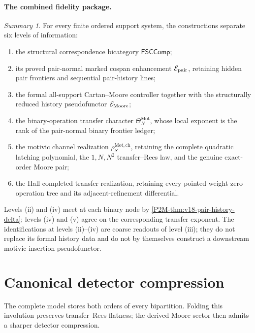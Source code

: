 \documentclass[11pt]{article}
\theoremstyle{remark}
\newtheorem*{summary}{Summary}
\newcommand{\Mot}{\mathrm{Mot}}
\providecommand{\FSCComp}{\mathsf{FSCComp}}
\begin{document}
\paragraph{The combined fidelity package.}

\begin{summary}
For every finite ordered support system, the constructions separate six
levels of information:
\begin{enumerate}[label=\textup{(\roman*)}]
\item the structural correspondence bicategory $\FSCComp$;
\item its proved pair-normal marked cospan enhancement
      $\mathcal E_{\rm pair}$, retaining hidden pair frontiers and sequential
      pair-history lines;
\item the formal all-support Cartan--Moore controller together with the
      structurally reduced history pseudofunctor $\mathcal E_{\rm Moore}$;
\item the binary-operation transfer character $\Theta_N^{\Mot}$, whose local
      exponent is the rank of the pair-normal binary frontier ledger;
\item the motivic channel realization $\rho_S^{\Mot,\mathrm{ch}}$, retaining
      the complete quadratic latching polynomial, the $1,N,N^2$ transfer--Rees
      law, and the genuine exact-order Moore pair;
\item the Hall-completed transfer realization, retaining every pointed
      weight-zero operation tree and its adjacent-refinement differential.
\end{enumerate}
Levels \textup{(ii)} and \textup{(iv)} meet at each binary node by
\cref{P2M-thm:v18-pair-history-delta}; levels \textup{(iv)} and \textup{(v)} agree
on the corresponding transfer exponent.  The identifications at levels \textup{(ii)}--\textup{(iv)} are coarse
readouts of level \textup{(iii)}; they do not replace its formal history
data and do not by themselves construct a downstream motivic insertion
pseudofunctor.
\end{summary}


\section{Canonical detector compression}

The complete model stores both orders of every bipartition.  Folding this
involution preserves transfer--Rees flatness; the derived Moore sector then
admits a sharper detector compression.
\end{document}
